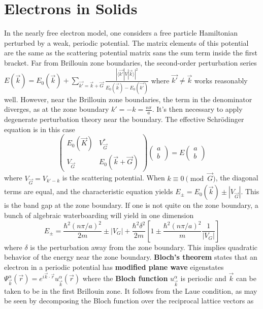 \documentclass[10pt]{article}
\begin{document}
\section*{Electrons in Solids}
In the nearly free electron model, one considers a free particle Hamiltonian perturbed by a weak, periodic potential.
The matrix elements of this potential are the same as the scattering potential matrix sans the sum term inside the first bracket.
Far from Brillouin zone boundaries, the second-order perturbation series
$E(\vec{k})=E_{0}(\vec{k})+\sum_{\vec{k'}=\vec{k}+\vec{G}}\frac{|\langle \vec{k'}|V|\vec{k} \rangle|^{2}}{E_{0}(\vec{k})-E_{0}(\vec{k'})}$
where $\vec{k'}\neq \vec{k}$ works reasonably well.
However, near the Brillouin zone boundaries, the term in the denominator diverges, as at the zone boundary ${k'}=-k=\frac{n\pi}{a}$.
It's then necessary to apply degenerate perturbation theory near the boundary.
The effective Schr\"odinger equation is in this case
\[
  \begin{pmatrix}
    E_{0}(\vec{K}) & V_{\vec{G}}^{*} \\
    V_{\vec{G}} & E_{0}(\vec{k}+\vec{G})
  \end{pmatrix}
  \begin{pmatrix}
    a \\
    b
  \end{pmatrix}
  = E
  \begin{pmatrix}
    a \\
    b
  \end{pmatrix}
\]
where $V_{\vec{G}}=V_{k'-k}$ is the scattering potential.
When $k\equiv 0 \pmod{\vec{G}}$, the diagonal terms are equal, and the characteristic equation yields
$E_{\pm}=E_{0}(\vec{k})\pm |V_{\vec{G}}|$.
This is the band gap at the zone boundary.
If one is not quite on the zone boundary, a bunch of algebraic waterboarding will yield in one dimension
\[
  E_{\pm}=\frac{\hbar^{2}(n\pi/a)^{2}}{2m}\pm|V_{G}|+\frac{\hbar^{2}\delta^{2}}{2m}\left[  1\pm\frac{\hbar^{2}(n\pi/a)^{2}}{m}\frac{1}{|V_{G}|}\right]
\]
where $\delta$ is the perturbation away from the zone boundary.
This implies quadratic behavior of the energy near the zone boundary.
\textbf{Bloch's theorem} states that an electron in a periodic potential has \textbf{modified plane wave} eigenstates
$\Psi_{\vec{k}}^{\alpha}(\vec{r})=e^{i\vec{k}\cdot\vec{r}}u_{\vec{k}}^{\alpha}(\vec{r})$
where the \textbf{Bloch function} $u_{\vec{k}}^{\alpha}$ is periodic and $\vec{k}$ can be taken to be in the first Brillouin zone.
It follows from the Laue condition, as may be seen by decomposing the Bloch function over the reciprocal lattice vectors as
\end{document}
